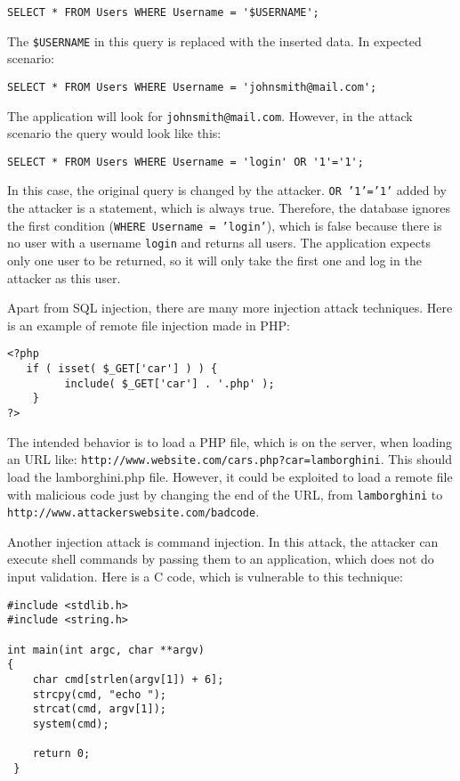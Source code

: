 \documentclass[a4paper]{article}
\begin{document}
\begin{verbatim}
SELECT * FROM Users WHERE Username = '$USERNAME';
\end{verbatim}

The \texttt{\$USERNAME} in this query is replaced with the inserted data. In
expected scenario:

\begin{verbatim}
SELECT * FROM Users WHERE Username = 'johnsmith@mail.com';
\end{verbatim}

The application will look for \texttt{johnsmith@mail.com}. However, in the
attack scenario the query would look like this:

\begin{verbatim}
SELECT * FROM Users WHERE Username = 'login' OR '1'='1';
\end{verbatim}

In this case, the original query is changed by the attacker. \texttt{OR
'1'='1'} added by the attacker is a statement, which is always true. Therefore,
the database ignores the first condition (\texttt{WHERE Username = 'login'}),
which is false because there is no user with a username \texttt{login} and
returns all users. The application expects only one user to be returned, so it
will only take the first one and log in the attacker as this user.

Apart from SQL injection, there are many more injection attack techniques. Here
is an example of remote file injection\autocite{rfi} made in PHP:

\begin{verbatim}
<?php
   if ( isset( $_GET['car'] ) ) {
         include( $_GET['car'] . '.php' );
    }
?>
\end{verbatim}

The intended behavior is to load a PHP file, which is on the server, when
loading an URL like: \texttt{http://www.website.com/cars.php?car=lamborghini}.
This should load the lamborghini.php file. However, it could be exploited to
load a remote file with malicious code just by changing the end of the URL,
from \texttt{lamborghini} to \texttt{http://www.attackerswebsite.com/badcode}.

Another injection attack is command injection.\autocite{cmdinjection} In this
attack, the attacker can execute shell commands by passing them to an
application, which does not do input validation. Here is a C code, which is
vulnerable to this technique:

\begin{verbatim}
#include <stdlib.h>
#include <string.h>

int main(int argc, char **argv)
{
	char cmd[strlen(argv[1]) + 6];
	strcpy(cmd, "echo ");
	strcat(cmd, argv[1]);
	system(cmd);
        
	return 0;
 }
\end{verbatim}
\end{document}
